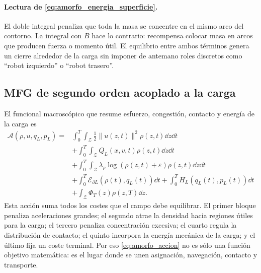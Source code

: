 \paragraph{Lectura de \eqref{eq:amorfo_energia_superficie}.}
El doble integral penaliza que toda la masa se concentre en el mismo arco del contorno.
La integral con $B$ hace lo contrario: recompensa colocar masa en arcos que producen
fuerza o momento útil. El equilibrio entre ambos términos genera un cierre alrededor de
la carga sin imponer de antemano roles discretos como ``robot izquierdo'' o ``robot
trasero''.

\subsection{MFG de segundo orden acoplado a la carga}
\label{subsec:amorfo-hjb-fpk}

El funcional macroscópico que resume esfuerzo, congestión, contacto y energía de la
carga es
\begin{equation}
\begin{aligned}
  \mathcal A(\rho,u,q_L,p_L)
  =
  &\int_0^T\!\int_{\mathcal Z}
    \frac12\|u(z,t)\|^2\rho(z,t)\dd z\dd t \\
  &+
  \int_0^T\!\int_{\mathcal Z}
    Q_L(x,v,t)\rho(z,t)\dd z\dd t \\
  &+
  \int_0^T\!\int_{\mathcal Z}
    \lambda_\rho\log(\rho(z,t)+\varepsilon)\rho(z,t)\dd z\dd t \\
  &+
  \int_0^T\mathcal E_{\partial L}(\rho(t),q_L(t))\dd t
  +
  \int_0^T H_L(q_L(t),p_L(t))\dd t \\
  &+
  \int_{\mathcal Z}\Phi_T(z)\rho(z,T)\dd z .
\end{aligned}
\label{eq:amorfo_accion}
\end{equation}
Esta acción suma todos los costes que el campo debe equilibrar. El primer bloque penaliza
aceleraciones grandes; el segundo atrae la densidad hacia regiones útiles para la carga;
el tercero penaliza concentración excesiva; el cuarto regula la distribución de contacto;
el quinto incorpora la energía mecánica de la carga; y el último fija un coste terminal.
Por eso \eqref{eq:amorfo_accion} no es sólo una función objetivo matemática: es el lugar
donde se unen asignación, navegación, contacto y transporte.

